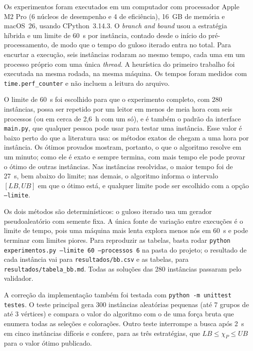 \documentclass[12pt]{article}
\newcommand{\chiP}{\chi_P}
\newcommand{\LB}{\mathit{LB}}
\newcommand{\UB}{\mathit{UB}}
\begin{document}
Os experimentos foram executados em um computador com processador Apple M2
Pro (6 núcleos de desempenho e 4 de eficiência), 16~GB de memória e macOS~26,
usando CPython~3.14.3. O \emph{branch and bound} usou a estratégia híbrida e
um limite de 60~s por instância, contado desde o início do pré-processamento,
de modo que o tempo do guloso iterado entra no total. Para encurtar a
execução, seis instâncias rodaram ao mesmo tempo, cada uma em um processo
próprio com uma única \emph{thread}. A heurística do primeiro trabalho foi
executada na mesma rodada, na mesma máquina. Os tempos foram medidos com
\texttt{time.perf\_counter} e não incluem a leitura do arquivo.

O limite de 60~s foi escolhido para que o experimento completo, com 280
instâncias, possa ser repetido por um leitor em menos de meia hora com seis
processos (ou em cerca de 2,6~h com um só), e é também o padrão da interface
\texttt{main.py}, que qualquer pessoa pode usar para testar uma instância. Esse
valor é baixo perto do que a literatura usa: os métodos exatos de
\cite{furini2018} chegam a uma hora por instância. Os ótimos provados
mostram, portanto, o que o algoritmo resolve em um minuto; como ele é exato e
sempre termina, com mais tempo ele pode provar o ótimo de outras instâncias.
Nas instâncias resolvidas, o maior tempo foi de 27~s, bem abaixo do limite; nas demais, o algoritmo informa o intervalo
$[\LB,\UB]$ em que o ótimo está, e qualquer limite pode ser escolhido com a
opção \texttt{--limite}.

Os dois métodos são determinísticos: o guloso iterado usa um gerador
pseudoaleatório com semente fixa. A única fonte de variação entre execuções é
o limite de tempo, pois uma máquina mais lenta explora menos nós em 60~s e
pode terminar com limites piores. Para reproduzir as tabelas, basta rodar
\texttt{python experimentos.py --limite 60 --processos 6} na pasta do projeto;
o resultado de cada instância vai para \texttt{resultados/bb.csv} e as
tabelas, para \texttt{resultados/tabela\_bb.md}. Todas as soluções das 280
instâncias passaram pelo validador.

A correção da implementação também foi testada com \texttt{python -m unittest
testes}. O teste principal gera 300 instâncias aleatórias pequenas (até 7
grupos de até 3 vértices) e compara o valor do algoritmo com o de uma força
bruta que enumera todas as seleções e colorações. Outro teste interrompe a
busca após 2~s em cinco instâncias difíceis e confere, para as três
estratégias, que $\LB\le\chiP\le\UB$ para o valor ótimo publicado.
\end{document}
